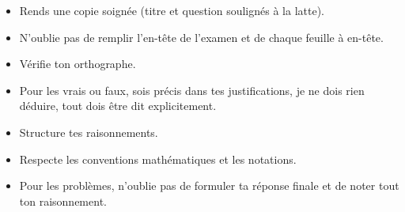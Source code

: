 \documentclass[a4paper, 12pt, parskip=half-]{scrartcl}
\begin{document}
\renewcommand{\examteacher}{M. Tanghe}
\entete
{}
\begin{itemize}
    \item Rends une copie soignée (titre et question soulignés à la latte).
    \item N'oublie pas de remplir l'en-tête de l'examen et de chaque feuille à en-tête.
    \item Vérifie ton orthographe.
    \item Pour les vrais ou faux, sois précis dans tes justifications, je ne dois rien déduire, tout dois être dit explicitement.
    \item Structure tes raisonnements.
    \item Respecte les conventions mathématiques et les notations.
    \item Pour les problèmes, n'oublie pas de formuler ta réponse finale et de noter tout ton raisonnement.
\end{itemize}
\newpage
\end{document}

